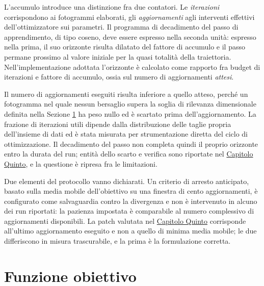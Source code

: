 \documentclass[a4paper,12pt]{report}
\begin{document}
L'accumulo introduce una distinzione fra due contatori. Le \emph{iterazioni}
corrispondono ai fotogrammi elaborati, gli \emph{aggiornamenti} agli interventi
effettivi dell'ottimizzatore sui parametri. Il programma di decadimento del
passo di apprendimento, di tipo coseno, deve essere espresso nella seconda
unità: espresso nella prima, il suo orizzonte risulta dilatato del fattore di
accumulo e il passo permane prossimo al valore iniziale per la quasi totalità
della traiettoria. Nell'implementazione adottata l'orizzonte è calcolato come
rapporto fra budget di iterazioni e fattore di accumulo, ossia sul numero di
aggiornamenti \emph{attesi}.

Il numero di aggiornamenti eseguiti risulta inferiore a quello atteso, perché un
fotogramma nel quale nessun bersaglio supera la soglia di rilevanza dimensionale
definita nella Sezione \ref{sec:loss} ha peso nullo ed è scartato prima
dell'aggiornamento. La frazione di iterazioni utili dipende dalla distribuzione
delle taglie propria dell'insieme di dati ed è stata misurata per strumentazione
diretta del ciclo di ottimizzazione. Il decadimento del passo non completa
quindi il proprio orizzonte entro la durata del run; entità dello scarto e
verifica sono riportate nel \hyperref[cap5]{Capitolo Quinto}, e la questione è ripresa fra le
limitazioni.

Due elementi del protocollo vanno dichiarati. Un criterio di arresto anticipato,
basato sulla media mobile dell'obiettivo su una finestra di cento aggiornamenti,
è configurato come salvaguardia contro la divergenza e non è intervenuto in
alcuno dei run riportati: la pazienza impostata è comparabile al numero
complessivo di aggiornamenti disponibili. La patch valutata nel \hyperref[cap5]{Capitolo Quinto} corrisponde all'ultimo aggiornamento eseguito e non a quello di
minima media mobile; le due differiscono in misura trascurabile, e la prima è la
formulazione corretta.

\section{Funzione obiettivo}
\label{sec:loss}
\end{document}

